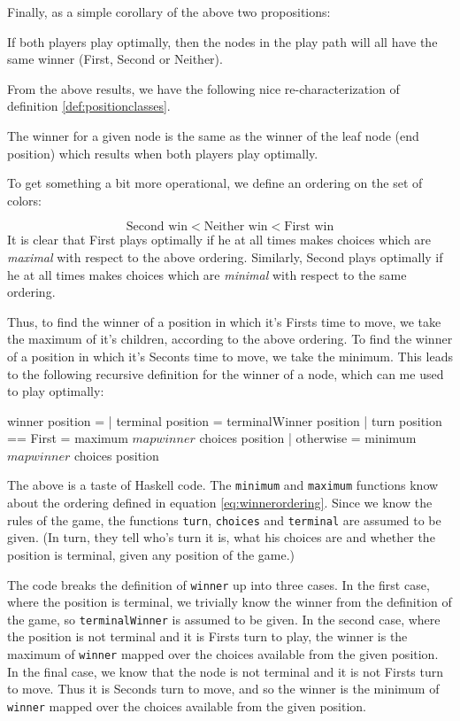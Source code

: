 Finally, as a simple corollary of the above two propositions:

\begin{proposition}
If both players play optimally, then the nodes in the play path will all have the same winner (First, Second or Neither).
\end{proposition}
From the above results, we have the following nice re-characterization of definition \ref{def:positionclasses}.

\begin{theorem}
The winner for a given node is the same as the winner of the leaf node (end position) which results when both players play optimally.
\end{theorem}
To get something a bit more operational, we define an ordering on the set of colors:

\begin{equation}
\label{eq:winnerordering}
  \text{Second win} < \text{Neither win} < \text{First win}
\end{equation}
It is clear that First plays optimally if he at all times makes choices which are \emph{maximal} with respect to the above ordering.
Similarly, Second plays optimally if he at all times makes choices which are \emph{minimal} with respect to the same ordering.

Thus, to find the winner of a position in which it's Firsts time to move, we take the maximum of it's children, according to the above ordering.
To find the winner of a position in which it's Seconts time to move, we take the minimum.
This leads to the following recursive definition for the winner of a node, which can me used to play optimally:

\begin{code}
  winner position =
    | terminal position      = terminalWinner position
    | turn position == First = maximum $ map winner $ choices position
    | otherwise              = minimum $ map winner $ choices position
\end{code}
The above is a taste of Haskell code.
The \texttt{minimum} and \texttt{maximum} functions know about the ordering defined in equation \ref{eq:winnerordering}.
Since we know the rules of the game, the functions \texttt{turn}, \texttt{choices} and \texttt{terminal} are assumed to be given.
(In turn, they tell who's turn it is, what his choices are and whether the position is terminal, given any position of the game.)

The code breaks the definition of \texttt{winner} up into three cases.
In the first case, where the position is terminal, we trivially know the winner from the definition of the game, so \texttt{terminalWinner} is assumed to be given.
In the second case, where the position is not terminal and it is Firsts turn to play, the winner is the maximum of \texttt{winner} mapped over the choices available from the given position.
In the final case, we know that the node is not terminal and it is not Firsts turn to move. Thus it is Seconds turn to move, and so the winner is the minimum of \texttt{winner} mapped over the choices available from the given position.

